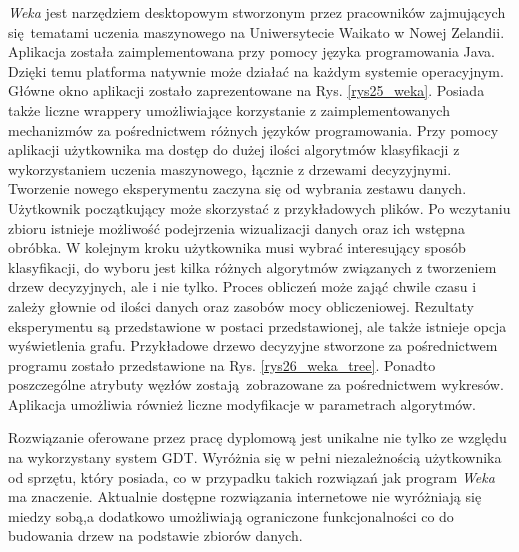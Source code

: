 \textit{Weka} jest narzędziem desktopowym stworzonym przez pracowników zajmujących się tematami uczenia maszynowego na Uniwersytecie Waikato w Nowej Zelandii. Aplikacja została zaimplementowana przy pomocy języka programowania Java. Dzięki temu platforma natywnie może działać na każdym systemie operacyjnym. Główne okno aplikacji zostało zaprezentowane na Rys. \ref{rys25_weka}. Posiada także liczne wrappery umożliwiające korzystanie z zaimplementowanych mechanizmów za pośrednictwem różnych języków programowania. Przy pomocy aplikacji użytkownika ma dostęp do dużej ilości algorytmów klasyfikacji z wykorzystaniem uczenia maszynowego, łącznie z drzewami decyzyjnymi. Tworzenie nowego eksperymentu zaczyna się od wybrania zestawu danych. Użytkownik początkujący może skorzystać z przykładowych plików. Po wczytaniu zbioru istnieje możliwość podejrzenia wizualizacji danych oraz ich wstępna obróbka. W kolejnym kroku użytkownika musi wybrać interesujący sposób klasyfikacji, do wyboru jest kilka różnych algorytmów związanych z tworzeniem drzew decyzyjnych, ale i nie tylko. Proces obliczeń może zająć chwile czasu i zależy głownie od ilości danych oraz zasobów mocy obliczeniowej. Rezultaty eksperymentu są przedstawione w postaci przedstawionej, ale także istnieje opcja wyświetlenia grafu. Przykładowe drzewo decyzyjne stworzone za pośrednictwem programu zostało przedstawione na Rys. \ref{rys26_weka_tree}. Ponadto poszczególne atrybuty węzłów zostają zobrazowane za pośrednictwem wykresów. Aplikacja umożliwia również liczne modyfikacje w parametrach algorytmów.  



Rozwiązanie oferowane przez pracę dyplomową jest unikalne nie tylko ze względu na wykorzystany system GDT. Wyróżnia się w pełni niezależnością użytkownika od sprzętu, który posiada, co w przypadku takich rozwiązań jak program \textit{Weka} ma znaczenie. Aktualnie dostępne rozwiązania internetowe nie wyróżniają się miedzy sobą,a dodatkowo umożliwiają ograniczone funkcjonalności co do budowania drzew na podstawie zbiorów danych. 